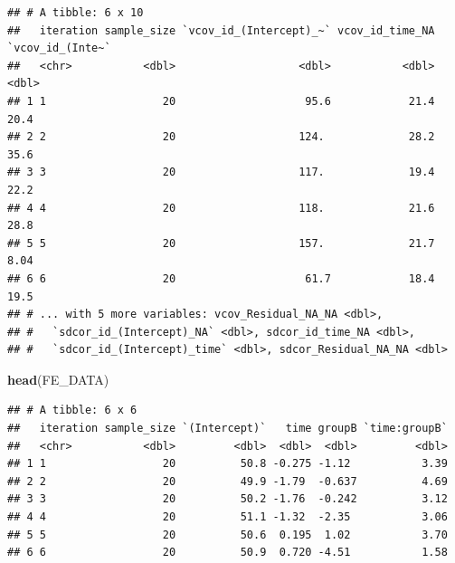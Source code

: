 \documentclass[
]{article}
\newenvironment{Shaded}{\begin{snugshade}}{\end{snugshade}}
\newcommand{\AttributeTok}[1]{\textcolor[rgb]{0.13,0.29,0.53}{#1}}
\newcommand{\CommentTok}[1]{\textcolor[rgb]{0.56,0.35,0.01}{\textit{#1}}}
\newcommand{\ConstantTok}[1]{\textcolor[rgb]{0.56,0.35,0.01}{#1}}
\newcommand{\DecValTok}[1]{\textcolor[rgb]{0.00,0.00,0.81}{#1}}
\newcommand{\FunctionTok}[1]{\textcolor[rgb]{0.13,0.29,0.53}{\textbf{#1}}}
\newcommand{\NormalTok}[1]{#1}
\newcommand{\OtherTok}[1]{\textcolor[rgb]{0.56,0.35,0.01}{#1}}
\newcommand{\SpecialCharTok}[1]{\textcolor[rgb]{0.81,0.36,0.00}{\textbf{#1}}}
\newcommand{\StringTok}[1]{\textcolor[rgb]{0.31,0.60,0.02}{#1}}
\begin{document}
\begin{Shaded}
\end{Shaded}

\begin{verbatim}
## # A tibble: 6 x 10
##   iteration sample_size `vcov_id_(Intercept)_~` vcov_id_time_NA `vcov_id_(Inte~`
##   <chr>           <dbl>                   <dbl>           <dbl>            <dbl>
## 1 1                  20                    95.6            21.4            20.4 
## 2 2                  20                   124.             28.2            35.6 
## 3 3                  20                   117.             19.4            22.2 
## 4 4                  20                   118.             21.6            28.8 
## 5 5                  20                   157.             21.7             8.04
## 6 6                  20                    61.7            18.4            19.5 
## # ... with 5 more variables: vcov_Residual_NA_NA <dbl>,
## #   `sdcor_id_(Intercept)_NA` <dbl>, sdcor_id_time_NA <dbl>,
## #   `sdcor_id_(Intercept)_time` <dbl>, sdcor_Residual_NA_NA <dbl>
\end{verbatim}

\begin{Shaded}
\begin{Highlighting}[]
\FunctionTok{head}\NormalTok{(FE\_DATA)}
\end{Highlighting}
\end{Shaded}

\begin{verbatim}
## # A tibble: 6 x 6
##   iteration sample_size `(Intercept)`   time groupB `time:groupB`
##   <chr>           <dbl>         <dbl>  <dbl>  <dbl>         <dbl>
## 1 1                  20          50.8 -0.275 -1.12           3.39
## 2 2                  20          49.9 -1.79  -0.637          4.69
## 3 3                  20          50.2 -1.76  -0.242          3.12
## 4 4                  20          51.1 -1.32  -2.35           3.06
## 5 5                  20          50.6  0.195  1.02           3.70
## 6 6                  20          50.9  0.720 -4.51           1.58
\end{verbatim}
\end{document}
